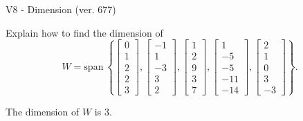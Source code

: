 \begin{exercise}
  \begin{exerciseTitle}V8 - Dimension (ver. 677)\end{exerciseTitle}
  \begin{exerciseStatement}
    Explain how to find the dimension of 
\[W=\mathrm{span}\ \left\{\left[\begin{array}{r}
0 \\
1 \\
2 \\
2 \\
3
\end{array}\right] , \left[\begin{array}{r}
-1 \\
1 \\
-3 \\
3 \\
2
\end{array}\right] , \left[\begin{array}{r}
1 \\
2 \\
9 \\
3 \\
7
\end{array}\right] , \left[\begin{array}{r}
1 \\
-5 \\
-5 \\
-11 \\
-14
\end{array}\right] , \left[\begin{array}{r}
2 \\
1 \\
0 \\
3 \\
-3
\end{array}\right]\right\}.\]



  \end{exerciseStatement}
  \begin{exerciseAnswer}
   The dimension of \(W\) is  \(3\).
  


  \end{exerciseAnswer}
\end{exercise}